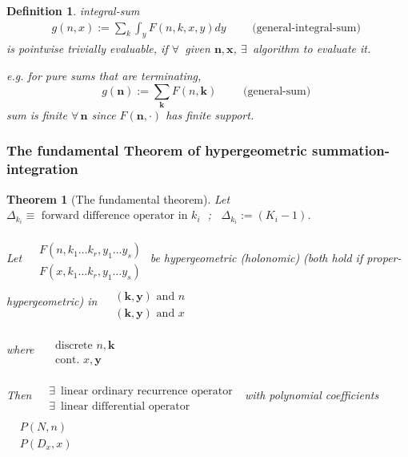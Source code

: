 \documentclass[10pt]{amsart}
\newtheorem{theorem}{Theorem}
\newtheorem{definition}{Definition}
\begin{document}
\begin{multicols*}{2}
\begin{definition}
  integral-sum
\[
\begin{gathered}
  g(n,x) := \sum_k \int_y F(n,k,x,y) dy \qquad \text{ (general-integral-sum) }
\end{gathered}
\]
is pointwise trivially evaluable, if $\forall \, $ given $\mathbf{n}, \mathbf{x}$, $\exists \, $ algorithm to evaluate it.  

e.g. for pure sums that are terminating, 
\[
g(\mathbf{n}) := \sum_{\mathbf{k}} F(n,\mathbf{k}) \qquad \text{ (general-sum) }
\]
sum is finite $\forall \, \mathbf{n}$ since $F(\mathbf{n},\cdot)$ has finite support.  
\end{definition}

\subsubsection{The fundamental Theorem of hypergeometric summation-integration}

\begin{theorem}[The fundamental theorem]
  Let $\Delta_{k_i} \equiv \text{ forward difference operator in $k_i$ }$; \, $\Delta_{k_i} := (K_i -1)$.  

Let $\begin{aligned} & \quad \\
  & F(n,k_1 \dots k_r, y_1 \dots y_s) \\ 
  & F(x,k_1 \dots k_r, y_1 \dots y_s) 
\end{aligned}$ be hypergeometric (holonomic) (both hold if proper-hypergeometric) in $\begin{aligned} & \quad \\
  & (\mathbf{k},\mathbf{y}) \text{ and } n \\
  & (\mathbf{k}, \mathbf{y}) \text{ and } x \end{aligned}$

where $\begin{aligned} & \quad \\
  & \text{ discrete } n, \mathbf{k} \\
  & \text{ cont. } x, \mathbf{y} \end{aligned}$

Then $\begin{aligned} & \quad  \\
  & \exists \, \text{ linear ordinary recurrence operator } \\
  & \exists \, \text{ linear differential operator } \end{aligned}$ with polynomial coefficients $\begin{aligned} & \quad \\
  & P(N,n) \\
  & P(D_x,x) \end{aligned}$


\end{theorem}
\end{multicols*}
\end{document}
